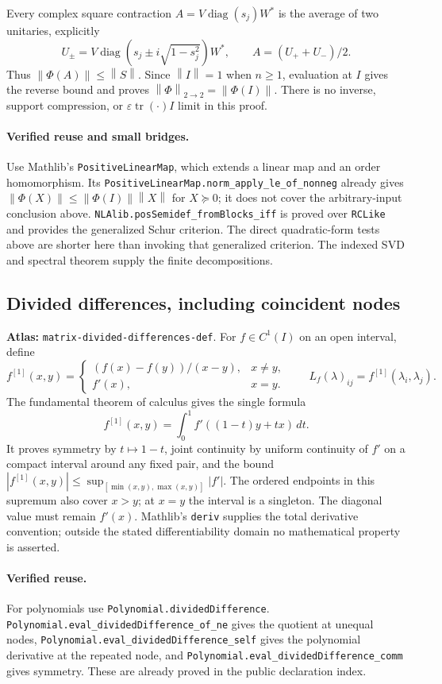 \documentclass[11pt,a4paper]{article}
\newcommand{\norm}[1]{\left\lVert#1\right\rVert}
\DeclareMathOperator{\tr}{tr}
\DeclareMathOperator{\diag}{diag}
\DeclareRobustCommand{\code}[1]{{\footnotesize\urlstyle{tt}\nolinkurl{#1}}}
\begin{document}
Every complex square contraction $A=V\diag(s_j)W^*$ is the average of
two unitaries, explicitly
\[
 U_\pm=V\diag(s_j\pm i\sqrt{1-s_j^2})W^*,\qquad A=(U_++U_-)/2.
\]
Thus $\norm{\Phi(A)}\le\norm S$. Since $\norm I=1$ when $n\ge1$,
evaluation at $I$ gives the reverse bound and proves
$\norm\Phi_{2\to2}=\norm{\Phi(I)}$. There is no inverse, support
compression, or $\varepsilon\tr(\cdot)I$ limit in this proof.

\paragraph{Verified reuse and small bridges.}
Use Mathlib's \code{PositiveLinearMap}, which extends a linear map and an
order homomorphism. Its \code{PositiveLinearMap.norm_apply_le_of_nonneg}
already gives $\norm{\Phi(X)}\le\norm{\Phi(I)}\norm X$ for $X\succeq0$;
it does not cover the arbitrary-input conclusion above.
\code{NLAlib.posSemidef_fromBlocks_iff} is proved over \code{RCLike}
and provides the generalized Schur criterion. The direct quadratic-form
tests above are shorter here than invoking that generalized criterion.
The indexed SVD and spectral theorem supply the finite decompositions.

\subsection{Divided differences, including coincident nodes}
\label{sec:matrix-divided-differences-def}
\textbf{Atlas:} \code{matrix-divided-differences-def}.
For $f\in C^1(I)$ on an open interval, define
\[
 f^{[1]}(x,y)=\begin{cases}(f(x)-f(y))/(x-y),&x\ne y,\\f'(x),&x=y.
 \end{cases}\qquad L_f(\lambda)_{ij}=f^{[1]}(\lambda_i,\lambda_j).
\]
The fundamental theorem of calculus gives the single formula
\[
 f^{[1]}(x,y)=\int_0^1f'((1-t)y+tx)\,dt.                       \tag{F5}
\]
It proves symmetry by $t\mapsto1-t$, joint continuity by uniform continuity
of $f'$ on a compact interval around any fixed pair, and the bound
$|f^{[1]}(x,y)|\le\sup_{[\min(x,y),\max(x,y)]}|f'|$.
The ordered endpoints in this supremum also cover $x>y$; at $x=y$ the
interval is a singleton. The diagonal value must remain $f'(x)$.
Mathlib's \code{deriv} supplies the total derivative convention; outside the
stated differentiability domain no mathematical property is asserted.

\paragraph{Verified reuse.}
For polynomials use \code{Polynomial.dividedDifference}.
\code{Polynomial.eval_dividedDifference_of_ne} gives the quotient at
unequal nodes, \code{Polynomial.eval_dividedDifference_self} gives the
polynomial derivative at the repeated node, and
\code{Polynomial.eval_dividedDifference_comm} gives symmetry. These are
already proved in the public declaration index.
\end{document}
